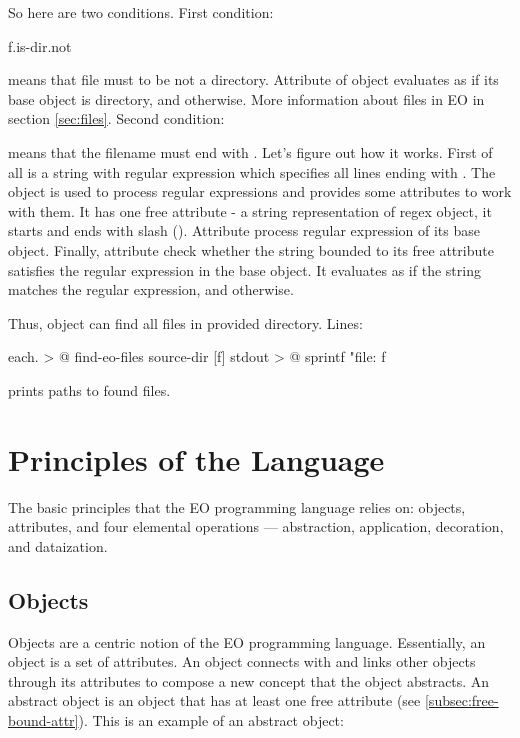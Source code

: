 \documentclass[12pt]{book}
\begin{document}
So here are two conditions. First condition:
\begin{ffcode}
f.is-dir.not
\end{ffcode}
means that file  must to be not a directory. Attribute  of  object evaluates as  if its base object is directory, and  otherwise. More information about files in EO in section \ref{sec:files}. Second condition:
means that the  filename must end with . Let's figure out how it works. First of all  is a string with regular expression which specifies all lines ending with . The  object is used to process regular expressions and provides some attributes to work with them. It has one free attribute - a string representation of regex object, it starts and ends with slash (\ff{/}). Attribute  process regular expression of its base  object. Finally, attribute  check whether the string bounded to its free attribute satisfies the regular expression in the base  object. It evaluates as  if the string matches the regular expression, and  otherwise.

Thus,  object can find all  files in provided directory. Lines:
\begin{ffcode}
each. > @
  find-eo-files
    source-dir
  [f]
    stdout > @
      sprintf
        "file: %
        f
\end{ffcode}
 prints paths to found files.

\chapter{Principles of the Language}
The basic principles that the EO programming language relies on: objects, attributes, and four elemental operations — abstraction, application, decoration, and dataization.

\section{Objects} \label{sec:objects}
Objects are a centric notion of the EO programming language. Essentially, an object is a set of attributes. An object connects with and links other objects through its attributes to compose a new concept that the object abstracts.
An abstract object is an object that has at least one free attribute (see \ref{subsec:free-bound-attr}).
This is an example of an abstract object:
\end{document}
